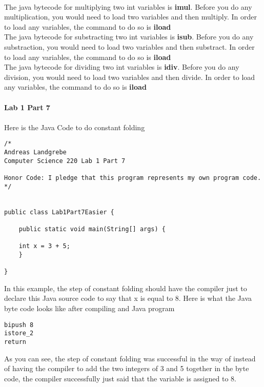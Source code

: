\documentclass{article}
\begin{document}
\\
The java bytecode for multiplying two int variables is \textbf{imul}. Before you do any multiplication, you would need to load two variables and then multiply. In order to load any variables, the command to do so is \textbf{iload}
\\
The java bytecode for substracting two int variables is \textbf{isub}. Before you do any substraction, you would need to load two variables and then substract. In order to load any variables, the command to do so is \textbf{iload}
\\
The java bytecode for dividing two int variables is \textbf{idiv}. Before you do any division, you would need to load two variables and then divide. In order to load any variables, the command to do so is \textbf{iload}
\\
\\
\textbf{Lab 1 Part 7}
\\
\\
Here is the Java Code to do constant folding
\begin{lstlisting}
/*
Andreas Landgrebe
Computer Science 220 Lab 1 Part 7

Honor Code: I pledge that this program represents my own program code.
*/


public class Lab1Part7Easier {

	public static void main(String[] args) {
	
	int x = 3 + 5;
	}
	
}
\end{lstlisting}
In this example, the step of constant folding should have the compiler just to declare this Java source code to say that x is equal to 8. Here is what the Java byte code looks like after compiling and Java program

\begin{lstlisting}
bipush 8
istore_2
return
\end{lstlisting}
As you can see, the step of constant folding was successful in the way of instead of having the compiler to add the two integers of 3 and 5 together in the byte code, the compiler successfully just said that the variable is assigned to 8. 



\end{document}
